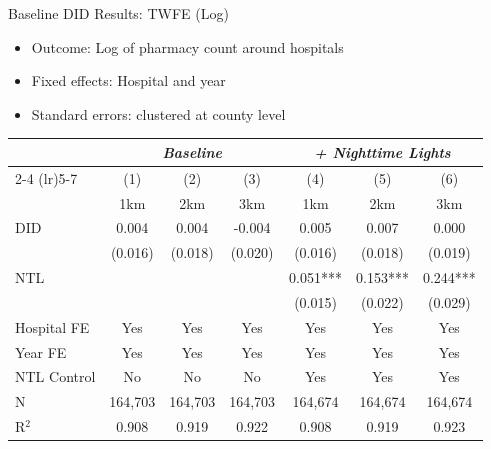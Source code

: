 \documentclass{beamer}
\begin{document}
\begin{frame}{Baseline DID Results: TWFE (Log)}

\begin{itemize}
    \item Outcome: Log of pharmacy count around hospitals
    \item Fixed effects: Hospital and year
    \item Standard errors: clustered at county level
\end{itemize}

\vspace{0.3em}

\centering
\footnotesize

\begin{table}[htbp]\centering
\begin{tabular}{lcccccc}
\toprule
& \multicolumn{3}{c}{\textit{Baseline}}
& \multicolumn{3}{c}{\textit{+ Nighttime Lights}} \\
\cmidrule(lr){2-4} \cmidrule(lr){5-7}
& (1) & (2) & (3) & (4) & (5) & (6) \\
& 1km & 2km & 3km & 1km & 2km & 3km \\
\midrule

DID
& 0.004 & 0.004 & -0.004
& 0.005 & 0.007 & 0.000 \\
& (0.016) & (0.018) & (0.020)
& (0.016) & (0.018) & (0.019) \\

NTL
&  &  & 
& 0.051*** & 0.153*** & 0.244*** \\
&
&
&
& (0.015) & (0.022) & (0.029) \\

\midrule

Hospital FE
& Yes & Yes & Yes
& Yes & Yes & Yes \\

Year FE
& Yes & Yes & Yes
& Yes & Yes & Yes \\

NTL Control
& No & No & No
& Yes & Yes & Yes \\

\midrule

N
& 164{,}703 & 164{,}703 & 164{,}703
& 164{,}674 & 164{,}674 & 164{,}674 \\

R$^{2}$
& 0.908 & 0.919 & 0.922
& 0.908 & 0.919 & 0.923 \\

\bottomrule
\end{tabular}
\end{table}

\end{frame}
\end{document}
